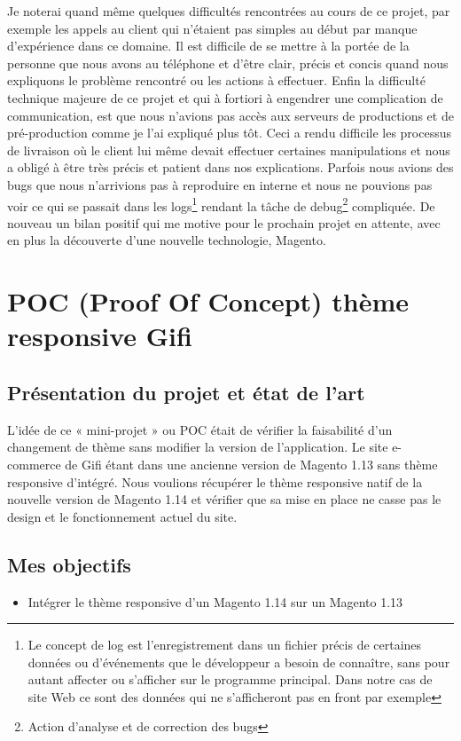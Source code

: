 \documentclass[a4paper,11pt,twoside]{report}
\begin{document}
    Je noterai quand même quelques difficultés rencontrées au cours de ce projet, par exemple les appels au client qui n'étaient pas simples au début par manque d'expérience dans ce domaine. Il est difficile de se mettre à la portée de la personne que nous avons au téléphone et d'être clair, précis et concis quand nous expliquons le problème rencontré ou les actions à effectuer. 
    Enfin la difficulté technique majeure de ce projet et qui à fortiori à engendrer une complication de communication, est que nous n'avions pas accès aux serveurs de productions et de pré-production comme je l'ai expliqué plus tôt. Ceci a rendu difficile les processus de livraison où le client lui même devait effectuer certaines manipulations et nous a obligé à être très précis et patient dans nos explications. Parfois nous avions des bugs que nous n'arrivions pas à reproduire en interne et nous ne pouvions pas voir ce qui se passait dans les logs\footnote{Le concept de log est l'enregistrement dans un fichier précis de certaines données ou d'événements que le développeur a besoin de connaître, sans pour autant affecter ou s'afficher sur le programme principal. Dans notre cas de site Web ce sont des données qui ne s'afficheront pas en front par exemple} rendant la tâche de debug\footnote{Action d'analyse et de correction des bugs} compliquée. De nouveau un bilan positif qui me motive pour le prochain projet en attente, avec en plus la découverte d'une nouvelle technologie, Magento.
    
    \newpage
    
  \section{POC (Proof Of Concept) thème responsive Gifi}
    \subsection*{Présentation du projet et état de l'art}
    L'idée de ce « mini-projet » ou POC était de vérifier la faisabilité d'un changement de thème sans modifier la version de l'application. Le site e-commerce de Gifi étant dans une ancienne version de Magento 1.13 sans thème responsive d'intégré. Nous voulions récupérer le thème responsive natif de la nouvelle version de Magento 1.14 et vérifier que sa mise en place ne casse pas le design et le fonctionnement actuel du site. 
    \subsection*{Mes objectifs}
      \begin{itemize}

	\item Intégrer le thème responsive d'un Magento 1.14 sur un Magento 1.13 

      \end{itemize}
\end{document}
